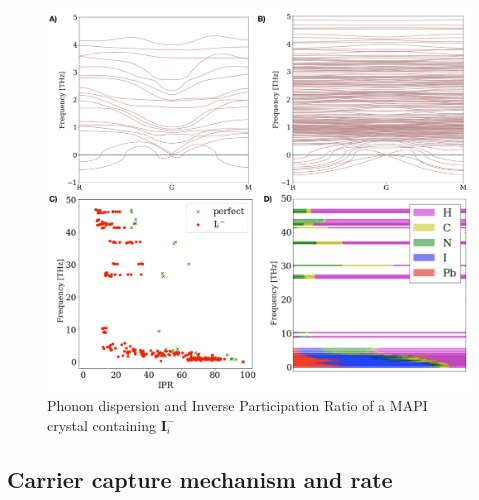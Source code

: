 \begin{figure}[h!]   
\centering
  \includegraphics[width=1.0\columnwidth]{figures/ch6/defect_dispersion_IPR.png}
  \caption[Phonon dispersion and Inverse Participation Ratio of a MAPI crystal containing $\mathbf{I}_i^{-}$]{Phonon dispersion and Inverse Participation Ratio of a MAPI crystal containing $\mathbf{I}_i^{-}$}
\label{defect_dispersion_IPR}
\end{figure}




\subsection{Carrier capture mechanism and rate}





